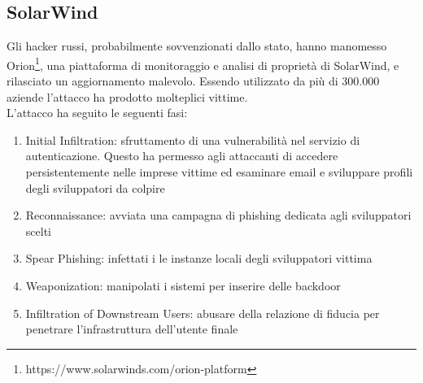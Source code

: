 \subsection{SolarWind}
\label{subsec:solarwind}
Gli hacker russi, probabilmente sovvenzionati dallo stato, hanno manomesso Orion\footnote{https://www.solarwinds.com/orion-platform}, una piattaforma di monitoraggio e analisi di proprietà di SolarWind, e rilasciato un aggiornamento malevolo.
Essendo utilizzato da più di 300.000 aziende l'attacco ha prodotto molteplici vittime.\\
L'attacco ha seguito le seguenti fasi:
\begin{enumerate}[noitemsep]
    \item Initial Infiltration: sfruttamento di una vulnerabilità nel servizio di autenticazione. Questo ha permesso agli attaccanti di accedere persistentemente nelle imprese vittime ed esaminare email e sviluppare profili degli sviluppatori da colpire
    \item Reconnaissance: avviata una campagna di phishing dedicata agli sviluppatori scelti
    \item Spear Phishing: infettati i le instanze locali degli sviluppatori vittima
    \item Weaponization: manipolati i sistemi per inserire delle backdoor
    \item Infiltration of Downstream Users: abusare della relazione di fiducia per penetrare l'infrastruttura dell'utente finale
\end{enumerate}

